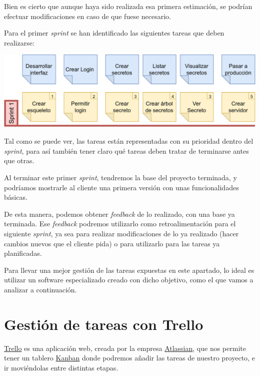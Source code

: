 \documentclass{\ClassPath/viu-tfm-template}
\begin{document}
Bien es cierto que aunque haya sido realizada esa primera estimación, se podrían efectuar modificaciones en caso de que fuese necesario.

Para el primer \textit{sprint} se han identificado las siguientes tareas que deben realizarse:

\begin{center}
    \includegraphics[width=\linewidth]{img/sprint1.png}
\end{center}

Tal como se puede ver, las tareas están representadas con su prioridad dentro del \textit{sprint}, para así también tener claro qué tareas deben tratar de terminarse antes que otras.

Al terminar este primer \textit{sprint}, tendremos la base del proyecto terminada, y podríamos mostrarle al cliente una primera versión con unas funcionalidades básicas.

De esta manera, podemos obtener \textit{feedback} de lo realizado, con una base ya terminada. Ese \textit{feedback} podremos utilizarlo como retroalimentación para el siguiente \textit{sprint}, ya sea para realizar modificaciones de lo ya realizado (hacer cambios nuevos que el cliente pida) o para utilizarlo para las tareas ya planificadas.

Para llevar una mejor gestión de las tareas expuestas en este apartado, lo ideal es utilizar un software especializado creado con dicho objetivo, como el que vamos a analizar a continuación.

\section{Gestión de tareas con Trello}

\href{https://trello.com/}{Trello} es una aplicación web, creada por la empresa \href{https://www.atlassian.com/}{Atlassian}, que nos permite tener un tablero \href{https://en.wikipedia.org/wiki/Kanban_(development)}{Kanban} donde podremos añadir las tareas de nuestro proyecto, e ir moviéndolas entre distintas etapas.
\end{document}

